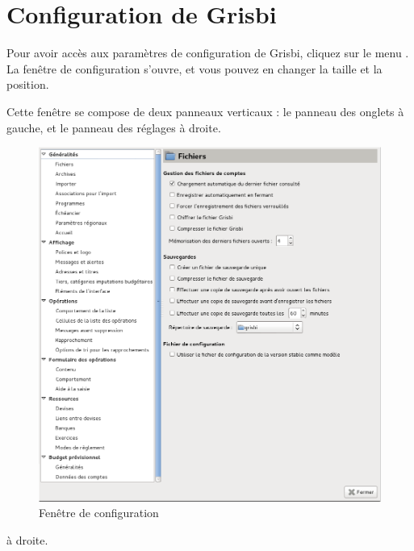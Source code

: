 
\chapter{Configuration de Grisbi\label{setup}}


Pour avoir accès aux paramètres de configuration de Grisbi, cliquez sur le menu . La fenêtre de configuration s'ouvre, et vous pouvez en changer la taille et la position. 

Cette fenêtre se compose de deux panneaux verticaux : le panneau des onglets à gauche, et le panneau des réglages \ifIllustration à droite.

\begin{figure}[htbp]
\begin{center}
\includegraphics[scale=0.42]{image/screenshot/setup_sections}
\end{center}
\caption{Fenêtre de configuration}
\label{setup-sections-img}
\end{figure}
\else à droite.
\fi

